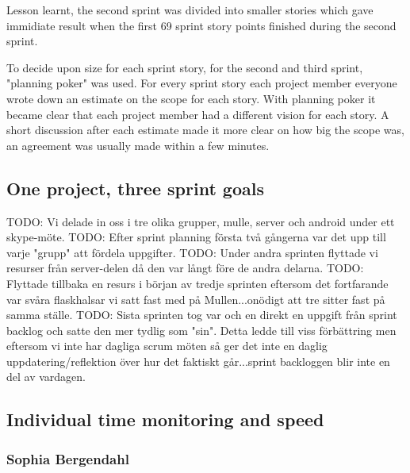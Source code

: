 Lesson learnt, the second sprint was divided into smaller stories which gave immidiate result when the first 69 sprint story points finished during the second sprint.

To decide upon size for each sprint story, for the second and third sprint, "planning poker" \cite[p.~42]{kniberg07} was used.
For every sprint story each project member everyone wrote down an estimate on the scope for each story.
With planning poker it became clear that each project member had a different vision for each story.
A short discussion after each estimate made it more clear on how big the scope was, an agreement was usually made within a few minutes.

%
%
\subsection{One project, three sprint goals}
TODO: Vi delade in oss i tre olika grupper, mulle, server och android under ett skype-möte.
TODO: Efter sprint planning första två gångerna var det upp till varje "grupp" att fördela uppgifter.
TODO: Under andra sprinten flyttade vi resurser från server-delen då den var långt före de andra delarna.
TODO: Flyttade tillbaka en resurs i början av tredje sprinten eftersom det fortfarande var svåra flaskhalsar vi satt fast med på Mullen...onödigt att tre sitter fast på samma ställe.
TODO: Sista sprinten tog var och en direkt en uppgift från sprint backlog och satte den mer tydlig som "sin". Detta ledde till viss förbättring men eftersom vi inte har dagliga scrum möten så ger det inte en daglig uppdatering/reflektion över hur det faktiskt går...sprint backloggen blir inte en del av vardagen.
\subsection{Individual time monitoring and speed}
\subsubsection{Sophia Bergendahl}
\newpage
